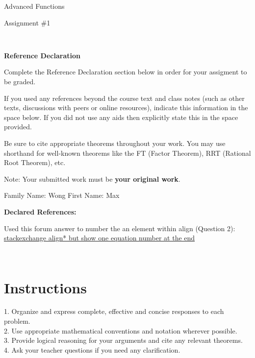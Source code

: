 \documentclass[12pt]{book}
\begin{document}
\vspace{-1.0in}\begin{center}
\Large{Advanced Functions }

\Large{Assignment \#1}


\end{center}


\vspace{0.015in}\hrulefill\ 

\textbf{Reference Declaration} %

Complete the Reference Declaration section below in order for your assigment to be graded.

If you used any references beyond the course text and class notes (such as other texts, discussions with peers or online resources), indicate this information in the space below.  If you did not use any aids then explicitly state this in the space provided. 

Be sure to cite appropriate theorems throughout your work. You may use shorthand for well-known theorems like the FT (Factor Theorem), RRT (Rational Root Theorem), etc. 

Note: Your submitted work must be \textbf{your original work}. 

Family Name: Wong%
First Name: Max%

\textbf{Declared References:} 

Used this forum answer to number the an element within align (Question 2): \\
\href{https://tex.stackexchange.com/questions/42726/align-but-show-one-equation-number-at-the-end}{stackexchange align* but show one equation number at the end}


\vspace{0.015in}\hrulefill\ 

\newpage


\section*{Instructions}
\begin{center}
\setlength{\fboxrule}{2pt}
\begin{boxedminipage}{6.5in}
1.	Organize and express complete, effective and concise responses to each problem.\\
2.	Use appropriate mathematical conventions and notation wherever possible.\\
3.	Provide logical reasoning for your arguments and cite any relevant theorems. \\
4.  Ask your teacher questions if you need any clarification.
\end{boxedminipage}
\end{center} 
\end{document}
